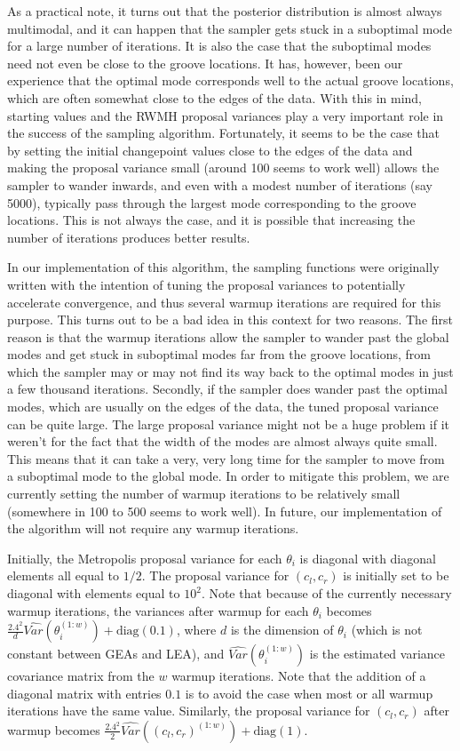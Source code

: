 \documentclass[12pt]{article}
\begin{document}
As a practical note, it turns out that the posterior distribution is
almost always multimodal, and it can happen that the sampler gets stuck
in a suboptimal mode for a large number of iterations. It is also the
case that the suboptimal modes need not even be close to the groove
locations. It has, however, been our experience that the optimal mode
corresponds well to the actual groove locations, which are often
somewhat close to the edges of the data. With this in mind, starting
values and the RWMH proposal variances play a very important role in the
success of the sampling algorithm. Fortunately, it seems to be the case
that by setting the initial changepoint values close to the edges of the
data and making the proposal variance small (around 100 seems to work
well) allows the sampler to wander inwards, and even with a modest
number of iterations (say 5000), typically pass through the largest mode
corresponding to the groove locations. This is not always the case, and
it is possible that increasing the number of iterations produces better
results.

In our implementation of this algorithm, the sampling functions were
originally written with the intention of tuning the proposal variances
to potentially accelerate convergence, and thus several warmup
iterations are required for this purpose. This turns out to be a bad
idea in this context for two reasons. The first reason is that the
warmup iterations allow the sampler to wander past the global modes and
get stuck in suboptimal modes far from the groove locations, from which
the sampler may or may not find its way back to the optimal modes in
just a few thousand iterations. Secondly, if the sampler does wander
past the optimal modes, which are usually on the edges of the data, the
tuned proposal variance can be quite large. The large proposal variance
might not be a huge problem if it weren't for the fact that the width of
the modes are almost always quite small. This means that it can take a
very, very long time for the sampler to move from a suboptimal mode to
the global mode. In order to mitigate this problem, we are currently
setting the number of warmup iterations to be relatively small
(somewhere in 100 to 500 seems to work well). In future, our
implementation of the algorithm will not require any warmup iterations.

Initially, the Metropolis proposal variance for each \(\theta_i\) is
diagonal with diagonal elements all equal to \(1/2\). The proposal
variance for \((c_l, c_r)\) is initially set to be diagonal with
elements equal to \(10^2\). Note that because of the currently necessary
warmup iterations, the variances after warmup for each \(\theta_i\)
becomes
\(\frac{2.4^2}{d}\hat{Var}(\theta_i^{(1:w)}) + \text{diag}(0.1)\), where
\(d\) is the dimension of \(\theta_i\) (which is not constant between
GEAs and LEA), and \(\hat{Var}(\theta_i^{(1:w)})\) is the estimated
variance covariance matrix from the \(w\) warmup iterations. Note that
the addition of a diagonal matrix with entries \(0.1\) is to avoid the
case when most or all warmup iterations have the same value. Similarly,
the proposal variance for \((c_l, c_r)\) after warmup becomes
\(\frac{2.4^2}{2}\hat{Var}((c_l,c_r)^{(1:w)}) + \text{diag}(1)\).
\end{document}
